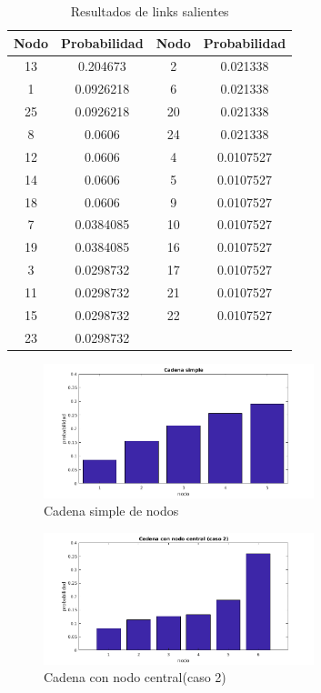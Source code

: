 \begin{table}[H]
\centering
	\begin{tabular}{|c|c|c|c|}
		\hline
		Nodo & Probabilidad & Nodo & Probabilidad \\ \hline
		13   & 0.204673     & 2    & 0.021338     \\
		1    & 0.0926218    & 6    & 0.021338     \\
		25   & 0.0926218    & 20   & 0.021338     \\
		8    & 0.0606       & 24   & 0.021338     \\
		12   & 0.0606       & 4    & 0.0107527    \\
		14   & 0.0606       & 5    & 0.0107527    \\
		18   & 0.0606       & 9    & 0.0107527    \\
		7    & 0.0384085    & 10   & 0.0107527    \\
		19   & 0.0384085    & 16   & 0.0107527    \\
		3    & 0.0298732    & 17   & 0.0107527    \\
		11   & 0.0298732    & 21   & 0.0107527    \\
		15   & 0.0298732    & 22   & 0.0107527    \\
		23   & 0.0298732    & ~    & ~            \\ \hline
	\end{tabular}
\caption{Resultados de links salientes}
\end{table}


\begin{figure}[H]
	\centering
	\includegraphics[width=0.7\textwidth]{img/barrascadena4.png}
	\caption{Cadena simple de nodos}
	\label{fig:Ranking cadena simple}
\end{figure}


\begin{figure}[H]
	\centering
	\includegraphics[width=0.7\textwidth]{img/cadena6v2.png}
	\caption{Cadena con nodo central(caso 2)}
	\label{fig:Ranking cadena con nodo central}
\end{figure}



